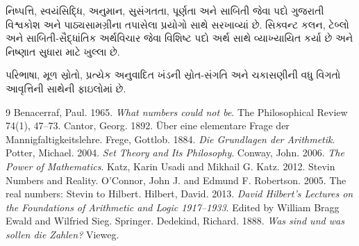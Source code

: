 નિષ્પત્તિ, સ્વયંસિદ્ધિ, અનુમાન, સુસંગતતા, પૂર્ણતા અને સાબિતી જેવા
પદો ગુજરાતી વિશ્વકોશ અને પાઠ્યસામગ્રીના તપાસેલા પ્રયોગો સાથે
સરખાવ્યાં છે. સિક્વન્ટ કલન, ટેબ્લો અને સાબિતી-સૈદ્ધાંતિક અર્થવિચાર
જેવા વિશિષ્ટ પદો અર્થ સાથે વ્યાખ્યાયિત કર્યા છે અને નિષ્ણાત સુધારા
માટે ખુલ્લા છે.

પરિભાષા, મૂળ સ્રોતો, પ્રત્યેક અનુવાદિત ખંડની સ્રોત-સંગતિ અને
ચકાસણીની વધુ વિગતો આવૃત્તિની સાથેની ફાઇલોમાં છે.
\begin{thebibliography}{9}
Benacerraf, Paul. 1965. \emph{What numbers could not be}.
The Philosophical Review 74(1), 47--73.
Cantor, Georg. 1892. Über eine elementare Frage der Mannigfaltigkeitslehre.
Frege, Gottlob. 1884. \emph{Die Grundlagen der Arithmetik}.
Potter, Michael. 2004. \emph{Set Theory and Its Philosophy}.
Conway, John. 2006. \emph{The Power of Mathematics}.
Katz, Karin Usadi and Mikhail G. Katz. 2012. Stevin Numbers and Reality.
O'Connor, John J. and Edmund F. Robertson. 2005. The real numbers: Stevin to Hilbert.
Hilbert, David. 2013. \emph{David Hilbert's Lectures on the Foundations of Arithmetic and Logic 1917--1933}.
Edited by William Bragg Ewald and Wilfried Sieg. Springer.
Dedekind, Richard. 1888. \emph{Was sind und was sollen die Zahlen?} Vieweg.
\end{thebibliography}

